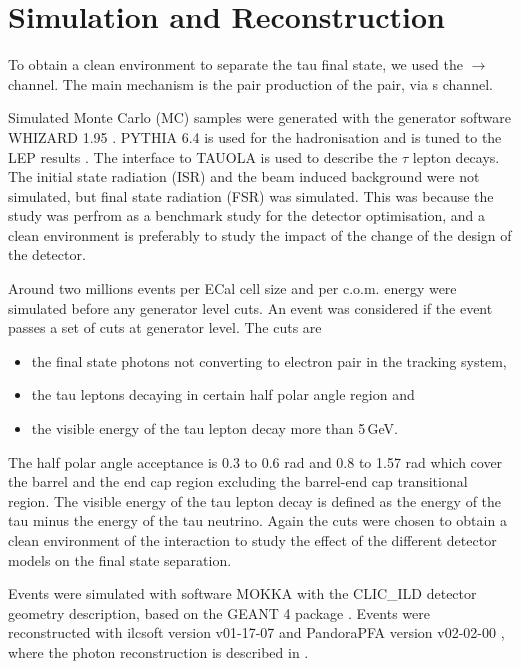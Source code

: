 \documentclass[a4paper,11pt]{article}
\begin{document}

\section{Simulation and Reconstruction}

To obtain a clean environment to separate the tau final state, we used the  \Pelectron\APelectron $\to$ \Ptauon\APtauon channel. The main mechanism is the pair production of the \Ptau pair, via s channel. 

Simulated Monte Carlo (MC) samples were generated with the generator software WHIZARD 1.95 \cite{whizard}. PYTHIA 6.4 \cite{Sjostrand:1995iq} is used for the hadronisation and is tuned to the LEP results \cite{}. The interface to TAUOLA \cite{Jadach:1993hs} is used to describe the $\tau$ lepton decays. The initial state radiation (ISR) and the beam induced background were not simulated, but final state radiation (FSR) was simulated. This was because the study was perfrom as a benchmark study for the detector optimisation, and a clean environment is preferably to study the impact of the change of the design of the detector.

Around two millions events per ECal cell size and per c.o.m. energy were simulated before any generator level cuts. An event was considered if the event passes a set of cuts at generator level. The cuts are 
\begin{itemize}
 \item the final state photons not converting to electron pair in the tracking system,
  \item the tau leptons decaying in certain half polar angle region and
  \item the visible energy of the tau lepton decay more than 5\,GeV.
\end{itemize}

The half polar angle acceptance is 0.3 to 0.6 rad and 0.8 to 1.57 rad which cover the barrel and the end cap region excluding the barrel-end cap transitional region. The visible energy of the tau lepton decay is defined as the energy of the tau minus the energy of the tau neutrino. Again the cuts were chosen to obtain a clean environment of the interaction to study the effect of the different detector models on the \Ptau final state separation.

Events were simulated with software MOKKA \cite{MoradeFreitas:2002kj} with the CLIC\_ILD detector geometry description, based on the GEANT 4 package  \cite{Agostinelli:2002hh}. Events were reconstructed with ilcsoft version v01-17-07 \cite{Gaede:82475} and PandoraPFA version v02-02-00 \cite{Marshall:2015rfa}, where the photon reconstruction is described in \cite{Xu:2016rcz}.
\end{document}
